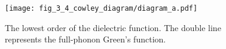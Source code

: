 
\begin{figure}[tb]
   \centering
   \texttt{[image: fig\_3\_4\_cowley\_diagram/diagram\_a.pdf]}
   \caption{The lowest order of the dielectric function. The double line represents the full-phonon Green's function.}
   \label{fig:diagram_a}
\end{figure}